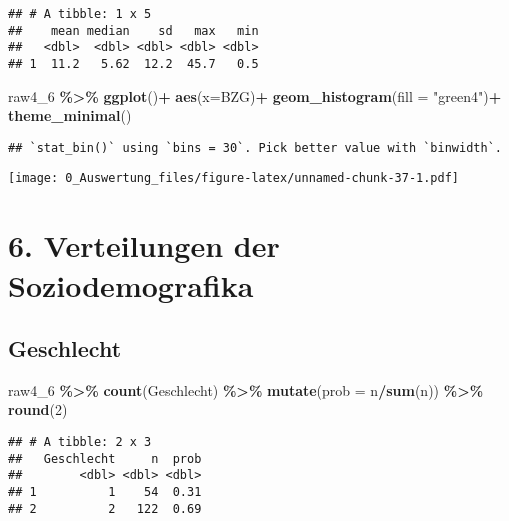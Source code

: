 \documentclass[
]{article}
\newenvironment{Shaded}{\begin{snugshade}}{\end{snugshade}}
\newcommand{\AttributeTok}[1]{\textcolor[rgb]{0.13,0.29,0.53}{#1}}
\newcommand{\DecValTok}[1]{\textcolor[rgb]{0.00,0.00,0.81}{#1}}
\newcommand{\FunctionTok}[1]{\textcolor[rgb]{0.13,0.29,0.53}{\textbf{#1}}}
\newcommand{\NormalTok}[1]{#1}
\newcommand{\SpecialCharTok}[1]{\textcolor[rgb]{0.81,0.36,0.00}{\textbf{#1}}}
\newcommand{\StringTok}[1]{\textcolor[rgb]{0.31,0.60,0.02}{#1}}
\begin{document}
\begin{verbatim}
## # A tibble: 1 x 5
##    mean median    sd   max   min
##   <dbl>  <dbl> <dbl> <dbl> <dbl>
## 1  11.2   5.62  12.2  45.7   0.5
\end{verbatim}

\begin{Shaded}
\begin{Highlighting}[]
\NormalTok{raw4\_6 }\SpecialCharTok{\%\textgreater{}\%} 
  \FunctionTok{ggplot}\NormalTok{()}\SpecialCharTok{+}
  \FunctionTok{aes}\NormalTok{(}\AttributeTok{x=}\NormalTok{BZG)}\SpecialCharTok{+}
  \FunctionTok{geom\_histogram}\NormalTok{(}\AttributeTok{fill =} \StringTok{"green4"}\NormalTok{)}\SpecialCharTok{+}
  \FunctionTok{theme\_minimal}\NormalTok{()}
\end{Highlighting}
\end{Shaded}

\begin{verbatim}
## `stat_bin()` using `bins = 30`. Pick better value with `binwidth`.
\end{verbatim}

\texttt{[image: 0\_Auswertung\_files/figure-latex/unnamed-chunk-37-1.pdf]}

\section{6. Verteilungen der
Soziodemografika}\label{verteilungen-der-soziodemografika}

\subsection{Geschlecht}\label{geschlecht}

\begin{Shaded}
\begin{Highlighting}[]
\NormalTok{raw4\_6 }\SpecialCharTok{\%\textgreater{}\%} 
  \FunctionTok{count}\NormalTok{(Geschlecht) }\SpecialCharTok{\%\textgreater{}\%} 
  \FunctionTok{mutate}\NormalTok{(}\AttributeTok{prob =}\NormalTok{ n}\SpecialCharTok{/}\FunctionTok{sum}\NormalTok{(n)) }\SpecialCharTok{\%\textgreater{}\%}
  \FunctionTok{round}\NormalTok{(}\DecValTok{2}\NormalTok{)}
\end{Highlighting}
\end{Shaded}

\begin{verbatim}
## # A tibble: 2 x 3
##   Geschlecht     n  prob
##        <dbl> <dbl> <dbl>
## 1          1    54  0.31
## 2          2   122  0.69
\end{verbatim}
\end{document}

